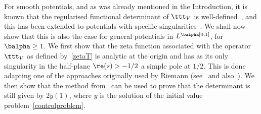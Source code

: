 For smooth potentials, and as was already mentioned in the Introduction, it is known that the regularised functional determinant of $\ttt_V$ is
well-defined~\cite{BFK,Levit-Smilansky}, and this has been extended to potentials with specific singularities~\cite{Lesch,Lesch-Tolk}.
We shall now show that this is also the case for general potentials in $L^\balpha[0,1]$, for $\balpha\geq 1$. We first show that the
zeta function associated with the operator $\ttt_V$ as defined by~\eqref{zetaT} is analytic at the origin and has as its only singularity
in the half-plane $\re(s)>-1/2$ a simple pole at $1/2$. This is done adapting one of the approaches originally used by Riemann (see~\cite{riem}
and also~\cite[p.\,21ff]{titc}). We then show that the method from~\cite{Levit-Smilansky} can be used to prove that the determinant is still given by $2y(1)$,
where $y$ is the solution of the initial value problem~\eqref{controlproblem}.


